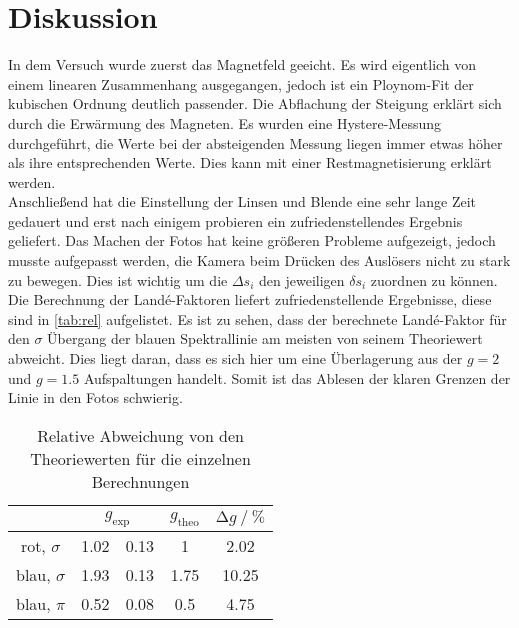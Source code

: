 \newpage
\section{Diskussion}

\noindent In dem Versuch wurde zuerst das Magnetfeld geeicht. Es wird eigentlich von einem linearen Zusammenhang ausgegangen, jedoch ist ein 
Ploynom-Fit der kubischen Ordnung deutlich passender. Die Abflachung der Steigung erklärt sich durch die Erwärmung des Magneten. Es wurden eine 
Hystere-Messung durchgeführt, die Werte bei der absteigenden Messung liegen immer etwas höher als ihre entsprechenden Werte. Dies kann mit einer 
Restmagnetisierung erklärt werden. \\

\noindent 
Anschließend hat die Einstellung der Linsen und Blende eine sehr lange Zeit gedauert und erst nach einigem probieren ein zufriedenstellendes Ergebnis 
geliefert. Das Machen der Fotos hat keine größeren Probleme aufgezeigt, jedoch musste aufgepasst werden, die Kamera beim Drücken des Auslösers nicht 
zu stark zu bewegen. Dies ist wichtig um die $\Delta s_i$ den jeweiligen $\delta s_i$ zuordnen zu können. \\

\noindent
Die Berechnung der Land\'{e}-Faktoren liefert zufriedenstellende Ergebnisse, diese sind in \autoref{tab:rel} aufgelistet. Es ist zu sehen, dass 
der berechnete Land\'{e}-Faktor für den $\sigma$ Übergang der blauen Spektrallinie am meisten von seinem Theoriewert abweicht. Dies liegt 
daran, dass es sich hier um eine Überlagerung aus der $g = \num{2}$ und $g = \num{1.5}$ Aufspaltungen handelt. Somit ist das Ablesen der klaren 
Grenzen der Linie in den Fotos schwierig. 


\begin{table}[ht]
    \centering
    \caption{Relative Abweichung von den Theoriewerten für die einzelnen Berechnungen}
    \label{tab:rel}
        \begin{tabular}{c S[table-format=1.2]@{${}\pm{}$}S[table-format=1.2] S[table-format=1.1] S[table-format=2.2]}
        \toprule
        &  & {$g_\text{theo}$} & {$\increment g \mathbin{/} \si{\percent} $} \\
        \midrule
        rot, $\sigma$ & 1.02 & 0.13 & 1 & 2.02\\
        blau, $\sigma$ &  1.93 & 0.13 & 1.75 & 10.25 \\
        blau, $\pi$ & 0.52 & 0.08 & 0.5 & 4.75 \\
        \bottomrule
    \end{tabular}
\end{table} 

